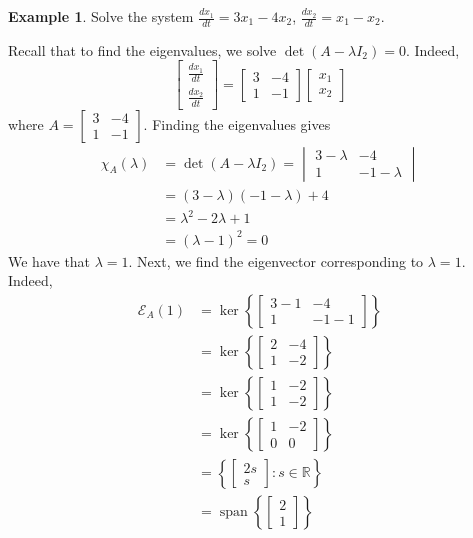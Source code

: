 \documentclass[11pt]{article}
\theoremstyle{definition}\newtheorem{definition}{Definition}
\theoremstyle{definition}\newtheorem{notation}{Notation}
\theoremstyle{definition}\newtheorem{example}{Example}
\theoremstyle{theorem}\newtheorem{theorem}{Theorem}
\theoremstyle{theorem}\newtheorem{corollary}{Corollary}
\theoremstyle{theorem}\newtheorem{proposition}{Proposition}
\theoremstyle{theorem}\newtheorem{lemma}{Lemma}
\theoremstyle{theorem}\newtheorem{question}{Question}
\theoremstyle{remark}\newtheorem{remark}{Remark}
\newcommand{\R}{\mathbb{R}}
\newcommand{\E}{\mathcal{E}}
\DeclareMathOperator{\Span}{span}
\begin{document}
\begin{example}
    Solve the system $\frac{dx_1}{dt} = 3x_1 - 4x_2$, $\frac{dx_2}{dt} = x_1 - x_2$.
\end{example}

Recall that to find the eigenvalues, we solve $\det(A - \lambda I_2) = 0$. Indeed,
\begin{equation*}
    \begin{bmatrix} \frac{dx_1}{dt} \\ \frac{dx_2}{dt} \end{bmatrix} = \begin{bmatrix} 3 & -4 \\ 1 & -1 \end{bmatrix} \begin{bmatrix} x_1 \\ x_2 \end{bmatrix}
\end{equation*}
where $A = \begin{bmatrix} 3 & -4 \\ 1 & -1 \end{bmatrix}$. Finding the eigenvalues gives
\begin{align*}
    \chi_A(\lambda) &= \det(A - \lambda I_2) = \begin{vmatrix} 3 - \lambda & -4 \\ 1 & -1 - \lambda \end{vmatrix} \\
    &= (3 - \lambda)(-1 - \lambda) + 4 \\
    &= \lambda^2 - 2\lambda + 1 \\
    &= (\lambda - 1)^2 = 0
\end{align*}
We have that $\lambda = 1$. Next, we find the eigenvector corresponding to $\lambda = 1$. Indeed,
\begin{align*}
    \E_A(1) &= \ker\left\{\begin{bmatrix} 3 - 1 & -4 \\ 1 & -1 - 1 \end{bmatrix}\right\} \\
    &= \ker\left\{\begin{bmatrix} 2 & -4 \\ 1 & -2 \end{bmatrix}\right\} \\
    &= \ker\left\{\begin{bmatrix} 1 & -2 \\ 1 & -2 \end{bmatrix}\right\} \\
    &= \ker\left\{\begin{bmatrix} 1 & -2 \\ 0 & 0 \end{bmatrix}\right\} \\
    &= \left\{\begin{bmatrix} 2s \\ s \end{bmatrix} : s \in \R\right\} \\
    &= \Span\left\{\begin{bmatrix} 2 \\ 1 \end{bmatrix}\right\}
\end{align*}
\end{document}
